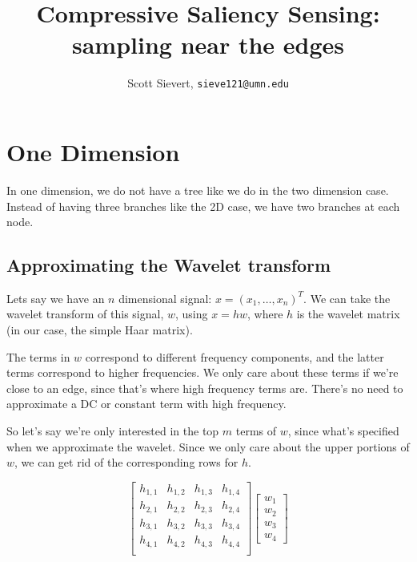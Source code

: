 \documentclass{article}
\title{Compressive Saliency Sensing: sampling near the edges}
\date{}
\author{Scott Sievert, \texttt{sieve121@umn.edu}}
\begin{document}
    \maketitle
    \tableofcontents
    \hrulefill

    \section{One Dimension}
        In one dimension, we do not have a tree like we do in the two dimension case. Instead of having three branches like the 2D case, we have two branches at each node.

        \subsection{Approximating the Wavelet transform}

          
          Lets say we have an $n$ dimensional signal: $x = (x_1,\ldots,x_n)^T$. We can take the wavelet transform of this signal, $w$, using $x = h w$, where $h$ is the wavelet matrix (in our case, the simple Haar matrix).

            The terms in $w$ correspond to different frequency components, and the latter terms correspond to higher frequencies. We only care about these terms if we're close to an edge, since that's where high frequency terms are. There's no need to approximate a DC or constant term with high frequency.

            So let's say we're only interested in the top $m$ terms of $w$, since what's specified when we approximate the wavelet. Since we only care about the upper portions of $w$, we can get rid of the corresponding rows for $h$.

            $$ 
                \begin{bmatrix}  
                    h_{1,1} & h_{1,2} &h_{1,3} &h_{1,4} \\
                    h_{2,1} & h_{2,2} &h_{2,3} &h_{2,4} \\
                    h_{3,1} & h_{3,2} &h_{3,3} &h_{3,4} \\
                    h_{4,1} & h_{4,2} &h_{4,3} &h_{4,4} \\
                
                \end{bmatrix}
                \begin{bmatrix}
                    w_1 \\ w_2 \\ w_3 \\ w_4
                \end{bmatrix}
            $$
\end{document}
